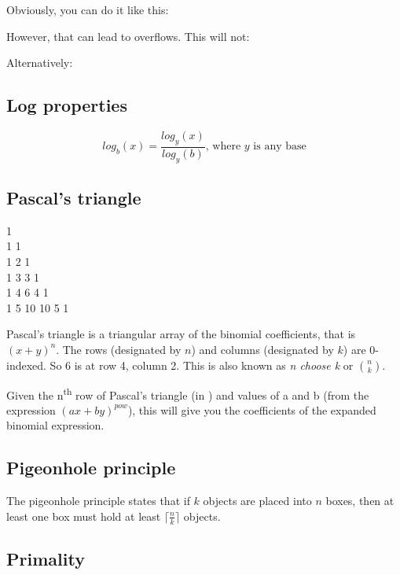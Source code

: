 Obviously, you can do it like this: 

However, that can lead to overflows. This will not: 

Alternatively: 

\subsection*{Log properties}

$$log_b(x) = \frac{log_y(x)}{log_y(b)} \text{, where } y \text{ is any base}$$

\subsection*{Pascal's triangle}

\begin{center}
1 \\
1 1 \\
1 2 1 \\
1 3 3 1 \\
1 4 6 4 1 \\
1 5 10 10 5 1
\end{center}

Pascal’s triangle is a triangular array of the binomial coefficients, that is $(x + y)^n$. The rows (designated by $n$) and columns (designated by $k$) are 0-indexed. So 6 is at row 4, column 2. This is also known as \textit{n choose k} or $\binom{n}{k}$.



Given the n\textsuperscript{th} row of Pascal's triangle (in ) and values of a and b (from the expression $(ax + by)^{pow}$), this will give you the coefficients of the expanded binomial expression.



\subsection*{Pigeonhole principle}

The pigeonhole principle states that if $k$ objects are placed into $n$ boxes, then at least one box must hold at least $\lceil \frac{n}{k} \rceil$ objects.

\subsection*{Primality}

